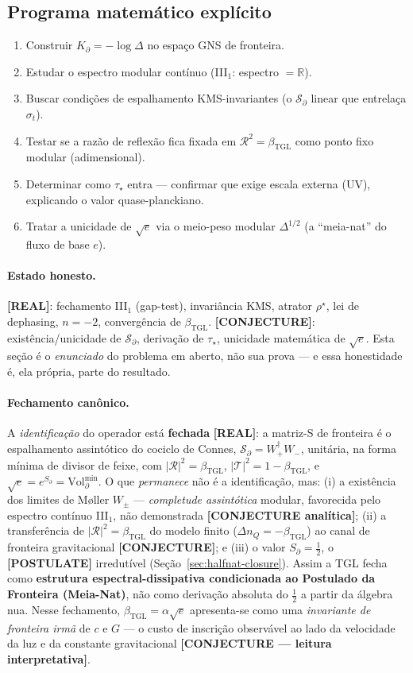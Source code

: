 \documentclass[12pt,a4paper]{article}
\newcommand{\betatgl}{\beta_{\text{TGL}}}
\newcommand{\Kpartial}{K_{\partial}}
\newcommand{\rhostar}{\rho^{\star}}
\newcommand{\TGL}{\textsc{TGL}}
\begin{document}
\subsection{Programa matemático explícito}
\begin{enumerate}
\item Construir $\Kpartial=-\log\Delta$ no espaço GNS de fronteira.
\item Estudar o espectro modular contínuo (III$_1$: espectro $=\mathbb{R}$).
\item Buscar condições de espalhamento KMS-invariantes (o $\mathcal S_\partial$ linear que entrelaça $\sigma_t$).
\item Testar se a razão de reflexão fica fixada em $\mathcal R^2=\betatgl$ como ponto fixo modular (adimensional).
\item Determinar como $\tau_\star$ entra --- confirmar que exige escala externa (UV), explicando o valor quase-planckiano.
\item Tratar a unicidade de $\sqrt e$ via o meio-peso modular $\Delta^{1/2}$ (a ``meia-nat'' do fluxo de base $e$).
\end{enumerate}
\paragraph{Estado honesto.} \textbf{[REAL]}: fechamento III$_1$ (gap-test), invariância KMS, atrator $\rhostar$, lei de dephasing, $n=-2$, convergência de $\betatgl$.  \textbf{[CONJECTURE]}: existência/unicidade de $\mathcal S_\partial$, derivação de $\tau_\star$, unicidade matemática de $\sqrt e$. Esta seção é o \emph{enunciado} do problema em aberto, não sua prova --- e essa honestidade é, ela própria, parte do resultado.

\paragraph{Fechamento canônico.} A \emph{identificação} do operador está \textbf{fechada} \textbf{[REAL]}: a matriz-S de fronteira é o espalhamento assintótico do cociclo de Connes, $\mathcal S_\partial = W_+^\dagger W_-$, unitária, na forma mínima de divisor de feixe, com $|\mathcal R|^2=\betatgl$, $|\mathcal T|^2=1-\betatgl$, e $\sqrt e = e^{S_\partial} = \mathrm{Vol}_\partial^{\min}$. O que \emph{permanece} não é a identificação, mas: (i) a existência dos limites de Møller $W_\pm$ --- \emph{completude assintótica} modular, favorecida pelo espectro contínuo III$_1$, não demonstrada \textbf{[CONJECTURE analítica]}; (ii) a transferência de $|\mathcal R|^2=\betatgl$ do modelo finito ($\Delta n_Q=-\betatgl$) ao canal de fronteira gravitacional \textbf{[CONJECTURE]}; e (iii) o valor $S_\partial=\tfrac12$, o \textbf{[POSTULATE]} irredutível (Seção~\ref{sec:halfnat-closure}). Assim a \TGL{} fecha como \textbf{estrutura espectral-dissipativa condicionada ao Postulado da Fronteira (Meia-Nat)}, não como derivação absoluta do $\tfrac12$ a partir da álgebra nua. Nesse fechamento, $\betatgl=\alpha\sqrt e$ apresenta-se como uma \emph{invariante de fronteira irmã} de $c$ e $G$ --- o custo de inscrição observável ao lado da velocidade da luz e da constante gravitacional \textbf{[CONJECTURE --- leitura interpretativa]}.
\end{document}
